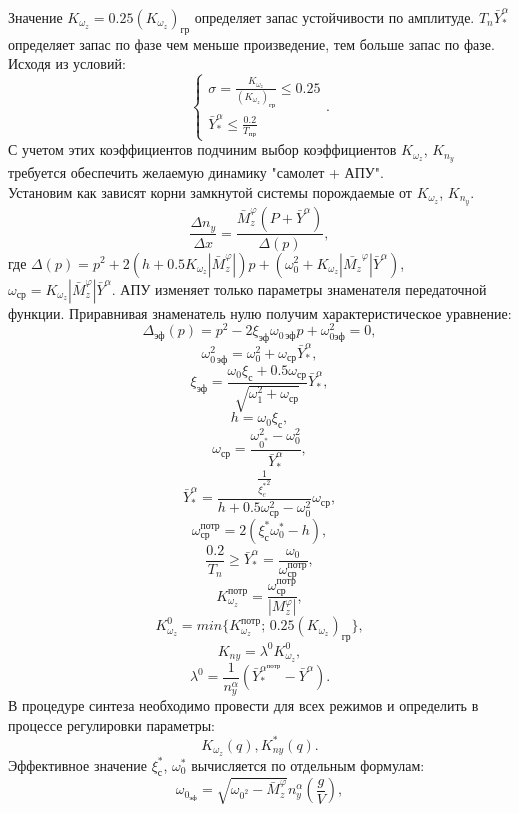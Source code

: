 \documentclass{article}
\begin{document}
Значение $K_{\omega_z} = 0.25(K_{\omega_z})_\text{гр}$ определяет запас
устойчивости по амплитуде. $T_n \bar{Y}_*^\alpha$ определяет запас по фазе чем
меньше произведение, тем больше запас по фазе.
Исходя из условий:
\[
    \begin{cases}
        \sigma = \frac{K_{\omega_z}}{(K_{\omega_z})_\text{гр}} \leq 0.25 \\
        \bar{Y}_*^\alpha \leq \frac{0.2}{T_\text{пр}}
    \end{cases}.
\]
С учетом этих коэффициентов подчиним выбор коэффициентов $K_{\omega_z}$,
$K_{n_y}$ требуется обеспечить желаемую динамику "самолет + АПУ".\\
Установим как зависят корни замкнутой системы порождаемые от $K_{\omega_z}$,
$K_{n_y}$.
\[
    \frac{\Delta n_y}{\Delta x} = \frac{\bar{M}_z^\varphi (P +
    \bar{Y}^\alpha)}{\Delta(p)},
\]
где $\Delta(p) = p^2 + 2(h+0.5 K_{\omega_z} |\bar{M}_z^\varphi|)p + (\omega_0^2
+ K_{\omega_z}|\bar{M_z}^\varphi|\bar{Y}^\alpha)$, $\omega_\text{ср} =
K_{\omega_z} |\bar{M}_z^\varphi| \bar{Y}^\alpha$.
АПУ изменяет только параметры знаменателя передаточной функции.
Приравнивая знаменатель нулю получим характеристическое уравнение:
\[
    \Delta_\text{эф}(p)= p^2 - 2 \xi_\text{эф}\omega_{0 \, \text{эф}}p +
    \omega_{0 \text{эф}}^2 = 0,
\]
\[
    \omega_{0 \, \text{эф}}^2 = \omega_0^2 + \omega_\text{ср}\bar{Y}^\alpha_*,
\]
\[
    \xi_\text{эф} = \frac{\omega_0 \xi_\text{с}
    +0.5\omega_\text{ср}}{\sqrt{\omega_1^2 + \omega_\text{ср}}}
    \bar{Y}^{\alpha}_* ,
\]
\[
    h = \omega_0 \xi_\text{с},
\]
\[
    \omega_\text{ср}= \frac{\omega_{0^*}^2 - \omega_0^2}{\bar{Y}^{\alpha}_*},
\]
\[
    \bar{Y}^{\alpha}_* = \frac{\frac{1}{{\xi_c^*}^2}}{h + 0.5
    \omega_\text{ср}^2- \omega_0^2}{\omega_\text{ср}},
\]
\[
    \omega_\text{ср}^{\text{потр}} = 2(\xi_\text{с}^* \omega_0^* - h),
\]
\[
    \frac{0.2}{T_n} \geq \bar{Y}^{\alpha}_* =
    \frac{\omega_0}{\omega_\text{ср}^{\text{потр}}},
\]
\[
    K_{\omega_z}^{\text{потр}} =
    \frac{\omega_\text{ср}^{\text{потр}}}{|M_z^{\varphi}|},
\]
\[
    K_{\omega_z}^0 = min\{K_{\omega_z}^{\text{потр}}; \,
    0.25(K_{\omega_z})_\text{гр}\},
\]
\[
    K_{ny}= \lambda^0 K^0_{\omega_z},
\]
\[
    \lambda^0 = \frac{1}{n_y^\alpha}(\bar{Y}^{\alpha^{\text{потр}}}_* -
    \bar{Y}^\alpha).
\]
В процедуре синтеза необходимо провести для всех режимов и определить в
процессе регулировки параметры:
\[
    K_{\omega_z}(q), K_{ny}^*(q).
\]
Эффективное значение $\xi_\text{с}^*$, $\omega_0^*$ вычисляется по отдельным
формулам:
\[
    \omega_{0_\text{эф}} = \sqrt{\omega_{0^{2}} -\bar{M}_z^{\varphi}}
    n_y^{\alpha}(\frac{g}{V}),
\]
\end{document}
